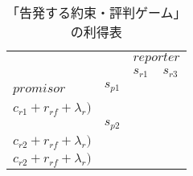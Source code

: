 \newcommand{\SROSinAcc}{ $(c_{p1} + r_{ps} + \epsilon_p,$ \\$ c_{r1} + r_{rs} + \epsilon_r)$ }
\newcommand{\FROSinAcc}{ $(c_{p1} + r_{pf} + \lambda_p,$ \\ $ c_{r1} + r_{rf} + \lambda_r)$ }
\newcommand{\FROFinAcc}{ $(c_{p2} + r_{pf} + \lambda_p,$ \\ $ c_{r2} + r_{rf} + \lambda_r)$ }

\begin{table*}
  \centering
  \begin{tabular}{|l|l|l|l|}
    \hline
    \multicolumn{2}{|l|}{\multirow{2}{*}{}} & \multicolumn{2}{l|}{$reporter$} \\ \cline{3-4}
    \multicolumn{2}{|l|}{}                  &$s_{r1}$&$s_{r3}$\\ \hline
    \multirow{2}{*}{$promisor$}
    &$s_{p1}$&\tabularc{\SROSinAcc}&\tabularc{\FROSinAcc}\\ \cline{2-4}
    &$s_{p2}$&\tabularc{\FROFinAcc}&\tabularc{\FROFinAcc}\\ \hline
  \end{tabular}
  \caption{「告発する約束・評判ゲーム」の利得表}
  \label{ethical-gametable}
\end{table*}